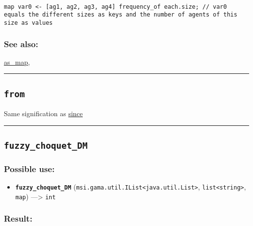 \documentclass[]{book}
\providecommand{\tightlist}{%
  \setlength{\itemsep}{0pt}\setlength{\parskip}{0pt}}
\theoremstyle{definition}
\theoremstyle{definition}
\theoremstyle{definition}
\theoremstyle{remark}
\begin{document}
\begin{verbatim}
 
map var0 <- [ag1, ag2, ag3, ag4] frequency_of each.size; // var0 equals the different sizes as keys and the number of agents of this size as values
\end{verbatim}

\subsubsection{See also:}\label{see-also-99}

\href{OperatorsAA\#as_map}{as\_map},

\begin{center}\rule{0.5\linewidth}{\linethickness}\end{center}

\subsection{\texorpdfstring{\texttt{from}}{from}}\label{from}

Same signification as \href{OperatorsSZ\#since}{since}

\begin{center}\rule{0.5\linewidth}{\linethickness}\end{center}

\subsection{\texorpdfstring{\texttt{fuzzy\_choquet\_DM}}{fuzzy\_choquet\_DM}}\label{fuzzy_choquet_dm}

\subsubsection{Possible use:}\label{possible-use-175}

\begin{itemize}
\tightlist
\item
  \textbf{\texttt{fuzzy\_choquet\_DM}}
  (\texttt{msi.gama.util.IList\textless{}java.util.List\textgreater{}},
  \texttt{list\textless{}string\textgreater{}}, \texttt{map})
  ---\textgreater{} \texttt{int}
\end{itemize}

\subsubsection{Result:}\label{result-169}
\end{document}
